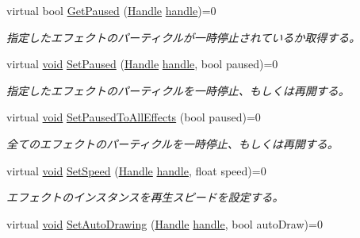 \begin{DoxyCompactItemize}
virtual bool \mbox{\hyperlink{class_effekseer_1_1_manager_af30924b879f3463d504991bf9780dfac}{Get\+Paused}} (\mbox{\hyperlink{namespace_effekseer_afba58b8d812da862190e9bbfc040824a}{Handle}} \mbox{\hyperlink{namespace_effekseer_afd99b336b206999bdcca3e431648efbc}{handle}})=0
\begin{DoxyCompactList}\small\item\em 指定したエフェクトのパーティクルが一時停止されているか取得する。 \end{DoxyCompactList}\item 
virtual \mbox{\hyperlink{namespace_effekseer_ab34c4088e512200cf4c2716f168deb56}{void}} \mbox{\hyperlink{class_effekseer_1_1_manager_a6414ea849302b7cef51b61a38c7ecd76}{Set\+Paused}} (\mbox{\hyperlink{namespace_effekseer_afba58b8d812da862190e9bbfc040824a}{Handle}} \mbox{\hyperlink{namespace_effekseer_afd99b336b206999bdcca3e431648efbc}{handle}}, bool paused)=0
\begin{DoxyCompactList}\small\item\em 指定したエフェクトのパーティクルを一時停止、もしくは再開する。 \end{DoxyCompactList}\item 
virtual \mbox{\hyperlink{namespace_effekseer_ab34c4088e512200cf4c2716f168deb56}{void}} \mbox{\hyperlink{class_effekseer_1_1_manager_a08c4c39a56fcc93b8acb284ff9bc933b}{Set\+Paused\+To\+All\+Effects}} (bool paused)=0
\begin{DoxyCompactList}\small\item\em 全てのエフェクトのパーティクルを一時停止、もしくは再開する。 \end{DoxyCompactList}\item 
virtual \mbox{\hyperlink{namespace_effekseer_ab34c4088e512200cf4c2716f168deb56}{void}} \mbox{\hyperlink{class_effekseer_1_1_manager_aa85b08562c442cfdce24781158a71431}{Set\+Speed}} (\mbox{\hyperlink{namespace_effekseer_afba58b8d812da862190e9bbfc040824a}{Handle}} \mbox{\hyperlink{namespace_effekseer_afd99b336b206999bdcca3e431648efbc}{handle}}, float speed)=0
\begin{DoxyCompactList}\small\item\em エフェクトのインスタンスを再生スピードを設定する。 \end{DoxyCompactList}\item 
virtual \mbox{\hyperlink{namespace_effekseer_ab34c4088e512200cf4c2716f168deb56}{void}} \mbox{\hyperlink{class_effekseer_1_1_manager_a3829cb7c98f3c41d79394eead1eaaa04}{Set\+Auto\+Drawing}} (\mbox{\hyperlink{namespace_effekseer_afba58b8d812da862190e9bbfc040824a}{Handle}} \mbox{\hyperlink{namespace_effekseer_afd99b336b206999bdcca3e431648efbc}{handle}}, bool auto\+Draw)=0

\end{DoxyCompactItemize}
